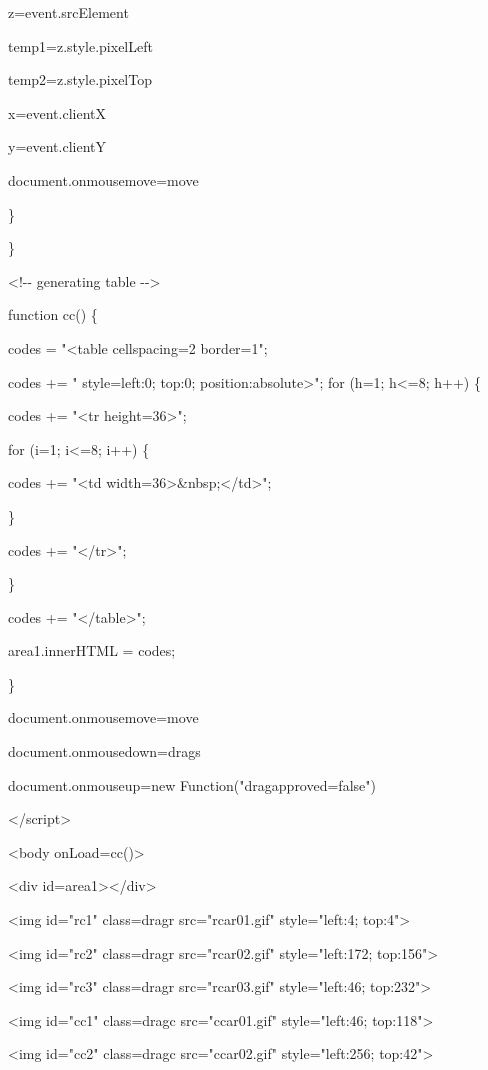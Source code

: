 \documentclass[
]{article}
\begin{document}
z=event.srcElement

temp1=z.style.pixelLeft

temp2=z.style.pixelTop

x=event.clientX

y=event.clientY

document.onmousemove=move

\}

\}

\textless!-\/- generating table -\/-\textgreater{}

function cc() \{

codes = "\textless table cellspacing=2 border=1";

codes += " style=\textquotesingle left:0; top:0;
position:absolute\textquotesingle\textgreater"; for (h=1; h\textless=8;
h++) \{

codes += "\textless tr height=36\textgreater";

for (i=1; i\textless=8; i++) \{

codes += "\textless td
width=36\textgreater\&nbsp;\textless/td\textgreater";

\}

codes += "\textless/tr\textgreater";

\}

codes += "\textless/table\textgreater";

area1.innerHTML = codes;

\}

document.onmousemove=move

document.onmousedown=drags

document.onmouseup=new Function("dragapproved=false")

\textless/script\textgreater{}

\textless body onLoad=cc()\textgreater{}

\textless div id=area1\textgreater\textless/div\textgreater{}

\textless img id="rc1" class=dragr src="rcar01.gif" style="left:4;
top:4"\textgreater{}

\textless img id="rc2" class=dragr src="rcar02.gif" style="left:172;
top:156"\textgreater{}

\textless img id="rc3" class=dragr src="rcar03.gif" style="left:46;
top:232"\textgreater{}

\textless img id="cc1" class=dragc src="ccar01.gif" style="left:46;
top:118"\textgreater{}

\textless img id="cc2" class=dragc src="ccar02.gif" style="left:256;
top:42"\textgreater{}
\end{document}

